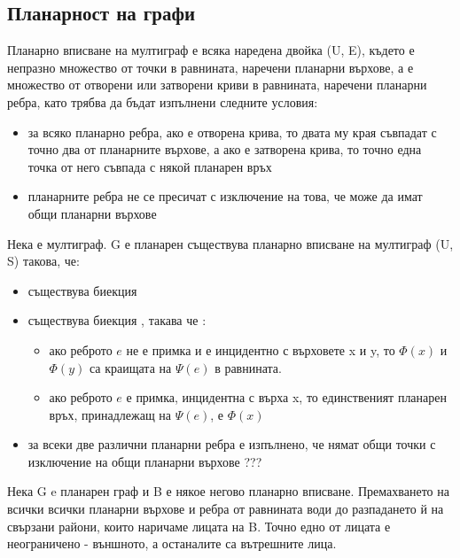 \subsection*{Планарност на графи}
\begin{definition}
    Планарно вписване на мултиграф е всяка наредена двойка (U, E), където  е 
    непразно множество от точки в равнината, наречени планарни върхове, а  е 
    множество от отворени или затворени криви в равнината, наречени планарни ребра, като трябва да бъдат 
    изпълнени следните условия:
    \begin{itemize}
        \item за всяко планарно ребра, ако е отворена крива, то двата му края съвпадат с точно два от 
        планарните върхове, а ако е затворена крива, то точно една точка от него съвпада с някой планарен връх
        \item планарните ребра не се пресичат с изключение на това, че може да имат общи планарни върхове
    \end{itemize}
\end{definition}

\begin{definition}
    Нека \graf е мултиграф. G е планарен \totw съществува планарно вписване на мултиграф (U, S) такова, че:
    \begin{itemize}
        \item съществува биекция 
        \item съществува биекция , такава че :
        \begin{itemize}
            \item ако реброто \(e\) не е примка и е инцидентно с върховете x и y, то \(\Phi(x)\) и 
            \(\Phi(y)\) са краищата на \(\Psi(e)\) в равнината.
            \item ако реброто \(e\) е примка, инцидентна с върха x, то единственият планарен връх, 
            принадлежащ на \(\Psi(e)\), е \(\Phi(x)\)
        \end{itemize}
        \item за всеки две различни планарни ребра е изпълнено, че нямат общи точки с изключение на 
        общи планарни върхове ???
    \end{itemize}
\end{definition}

\begin{definition}
    Нека G e планарен граф и B е някое негово планарно вписване. Премахването на всички всички планарни 
    върхове и ребра от равнината води до разпадането й на свързани райони, които наричаме лицата на B. 
    Точно едно от лицата е неограничено - външното, а останалите са вътрешните лица.
\end{definition}

